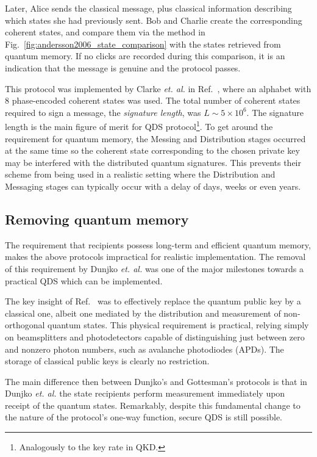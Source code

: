 Later, Alice sends the classical message, plus classical information describing which states she had previously sent. Bob and Charlie create the corresponding coherent states, and compare them via the method in Fig.~\ref{fig:andersson2006_state_comparison} with the states retrieved from quantum memory. If no clicks are recorded during this comparison, it is an indication that the message is genuine and the protocol passes.

This protocol was implemented by Clarke \emph{et. al.} in Ref.~\cite{Clarke2012}, where an alphabet with $8$ phase-encoded coherent states was used. The total number of coherent states required to sign a message, the \emph{signature length}, was $L \sim 5 \times 10^6$. The signature length is the main figure of merit for QDS protocol\footnote{Analogously to the key rate in QKD.}. To get around the requirement for quantum memory, the Messing and Distribution stages occurred at the same time so the coherent state corresponding to the chosen private key may be interfered with the distributed quantum signatures. This prevents their scheme from being used in a realistic setting where the Distribution and Messaging stages can typically occur with a delay of days, weeks or even years.


\subsection{Removing quantum memory}
The requirement that recipients possess long-term and efficient quantum memory, makes the above protocols impractical for realistic implementation. The removal of this requirement by Dunjko \emph{et. al.} \cite{Dunjko2014} was one of the major milestones towards a practical QDS which can be implemented. 

The key insight of Ref.~\cite{Dunjko2014} was to effectively replace the quantum public key by a classical one, albeit one mediated by the distribution and measurement of non-orthogonal quantum states. This physical requirement is practical, relying simply on beamsplitters and photodetectors capable of distinguishing just between zero and nonzero photon numbers, such as avalanche photodiodes (APDs). The storage of classical public keys is clearly no restriction. 

The main difference then between Dunjko's \cite{Dunjko2014} and Gottesman's \cite{Andersson2006} protocols is that in Dunjko \emph{et. al.} the state recipients perform measurement immediately upon receipt of the quantum states. Remarkably, despite this fundamental change to the nature of the protocol's one-way function, secure QDS is still possible. 

